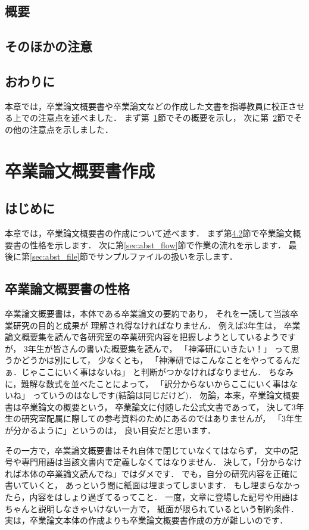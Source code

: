 \documentclass[a4j,12pt,dvipdfmx,oneside]{jsbook}
\theoremstyle{definition}
\begin{document}
\section{概要}\label{sec:checkManuscript_abst}
%
%
%
\section{そのほかの注意}\label{sec:checkManuscript_misc}
%
%
%
\section{おわりに}\label{sec:checkManuscript_summary}
本章では，卒業論文概要書や卒業論文などの作成した文書を指導教員に校正させ
る上での注意点を述べました．
まず第~\ref{sec:checkManuscript_abst}節でその概要を示し，
次に第~\ref{sec:checkManuscript_misc}節でその他の注意点を示しました．
%
%
%
\chapter{卒業論文概要書作成}\label{chap:abst}
%
%
%
\section{はじめに}\label{sec:abst_intro}
本章では，卒業論文概要書の作成について述べます．
まず第\ref{sec:abst_feature}節で卒業論文概要書の性格を示します．
次に第\ref{sec:abst_flow}節で作業の流れを示します．
最後に第\ref{sec:abst_file}節でサンプルファイルの扱いを示します．
%
%
%
\section{卒業論文概要書の性格}\label{sec:abst_feature}
卒業論文概要書は，本体である卒業論文の要約であり，
それを一読して当該卒業研究の目的と成果が
理解され得なければなりません．
例えば3年生は，
卒業論文概要集を読んで各研究室の卒業研究内容を把握しようとしているようですが，
3年生が皆さんの書いた概要集を読んで，
「神澤研にいきたい！」
って思うかどうかは別にして，
少なくとも，
「神澤研ではこんなことをやってるんだぁ．じゃここにいく事はないね」
と判断がつかなければなりません．
ちなみに，難解な数式を並べたことによって，
「訳分からないからここにいく事はないね」
っていうのはなしです(結論は同じだけど)．
勿論，本来，卒業論文概要書は卒業論文の概要という，
卒業論文に付随した公式文書であって，
決して3年生の研究室配属に際しての参考資料のためにあるのではありませんが，
「3年生が分かるように」というのは，
良い目安だと思います．

その一方で，卒業論文概要書はそれ自体で閉じていなくてはならず，
文中の記号や専門用語は当該文書内で定義しなくてはなりません．
決して，「分からなければ本体の卒業論文読んでね」ではダメです．
でも，自分の研究内容を正確に書いていくと，
あっという間に紙面は埋まってしまいます．
もし埋まらなかったら，内容をはしょり過ぎてるってこと．
一度，文章に登場した記号や用語はちゃんと説明しなきゃいけない一方で，
紙面が限られているという制約条件．
実は，卒業論文本体の作成よりも卒業論文概要書作成の方が難しいのです．
\end{document}
